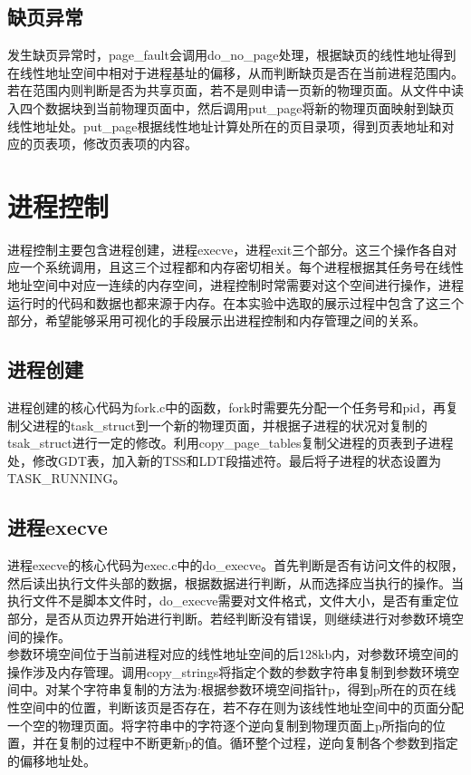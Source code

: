 \documentclass[]{report}
\begin{document}
\subsection{缺页异常}
发生缺页异常时，page\_fault会调用do\_no\_page处理，根据缺页的线性地址得到在线性地址空间中相对于进程基址的偏移，从而判断缺页是否在当前进程范围内。若在范围内则判断是否为共享页面，若不是则申请一页新的物理页面。从文件中读入四个数据块到当前物理页面中，然后调用put\_page将新的物理页面映射到缺页线性地址处。put\_page根据线性地址计算处所在的页目录项，得到页表地址和对应的页表项，修改页表项的内容。

\section{进程控制}
进程控制主要包含进程创建，进程execve，进程exit三个部分。这三个操作各自对应一个系统调用，且这三个过程都和内存密切相关。每个进程根据其任务号在线性地址空间中对应一连续的内存空间，进程控制时常需要对这个空间进行操作，进程运行时的代码和数据也都来源于内存。在本实验中选取的展示过程中包含了这三个部分，希望能够采用可视化的手段展示出进程控制和内存管理之间的关系。\\

\subsection{进程创建}
进程创建的核心代码为fork.c中的函数，fork时需要先分配一个任务号和pid，再复制父进程的task\_struct到一个新的物理页面，并根据子进程的状况对复制的tsak\_struct进行一定的修改。利用copy\_page\_tables复制父进程的页表到子进程处，修改GDT表，加入新的TSS和LDT段描述符。最后将子进程的状态设置为TASK\_RUNNING。\\

\subsection{进程execve}
进程execve的核心代码为exec.c中的do\_execve。首先判断是否有访问文件的权限，然后读出执行文件头部的数据，根据数据进行判断，从而选择应当执行的操作。当执行文件不是脚本文件时，do\_execve需要对文件格式，文件大小，是否有重定位部分，是否从页边界开始进行判断。若经判断没有错误，则继续进行对参数环境空间的操作。\\

参数环境空间位于当前进程对应的线性地址空间的后128kb内，对参数环境空间的操作涉及内存管理。调用copy\_strings将指定个数的参数字符串复制到参数环境空间中。对某个字符串复制的方法为:根据参数环境空间指针p，得到p所在的页在线性空间中的位置，判断该页是否存在，若不存在则为该线性地址空间中的页面分配一个空的物理页面。将字符串中的字符逐个逆向复制到物理页面上p所指向的位置，并在复制的过程中不断更新p的值。循环整个过程，逆向复制各个参数到指定的偏移地址处。\\
\end{document}
